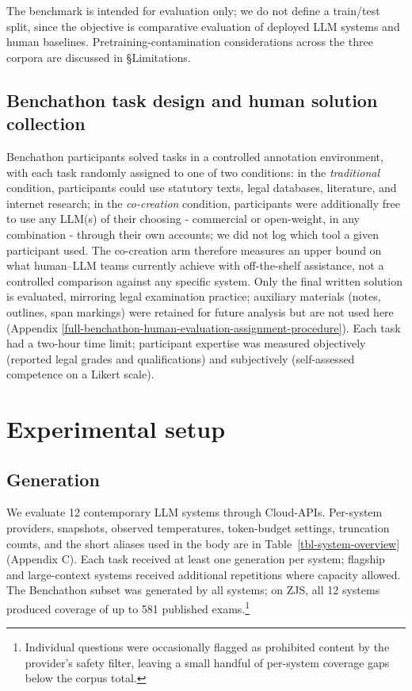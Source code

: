 \documentclass[11pt]{article}
\begin{document}
The benchmark is intended for evaluation only; we do not define a
train/test split, since the objective is comparative evaluation of
deployed LLM systems and human baselines. Pretraining-contamination
considerations across the three corpora are discussed in §Limitations.

\subsection{Benchathon task design and human solution
collection}\label{benchathon-task-design-and-human-solution-collection}

Benchathon participants solved tasks in a controlled annotation
environment, with each task randomly assigned to one of two conditions:
in the \emph{traditional} condition, participants could use statutory
texts, legal databases, literature, and internet research; in the
\emph{co-creation} condition, participants were additionally free to use
any LLM(s) of their choosing - commercial or open-weight, in any
combination - through their own accounts; we did not log which tool a
given participant used. The co-creation arm therefore measures an upper
bound on what human--LLM teams currently achieve with off-the-shelf
assistance, not a controlled comparison against any specific system.
Only the final written solution is evaluated, mirroring legal
examination practice; auxiliary materials (notes, outlines, span
markings) were retained for future analysis but are not used here
(Appendix \ref{full-benchathon-human-evaluation-assignment-procedure}).
Each task had a two-hour time limit; participant expertise was measured
objectively (reported legal grades and qualifications) and subjectively
(self-assessed competence on a Likert scale).

\section{Experimental setup}\label{experimental-setup}

\subsection{Generation}\label{generation}

We evaluate 12 contemporary LLM systems through Cloud-APIs. Per-system
providers, snapshots, observed temperatures, token-budget settings,
truncation counts, and the short aliases used in the body are in
Table~\ref{tbl-system-overview} (Appendix C). Each task received at
least one generation per system; flagship and large-context systems
received additional repetitions where capacity allowed. The Benchathon
subset was generated by all systems; on ZJS, all 12 systems produced
coverage of up to 581 published exams.\footnote{Individual questions
  were occasionally flagged as prohibited content by the provider's
  safety filter, leaving a small handful of per-system coverage gaps
  below the corpus total.}
\end{document}
